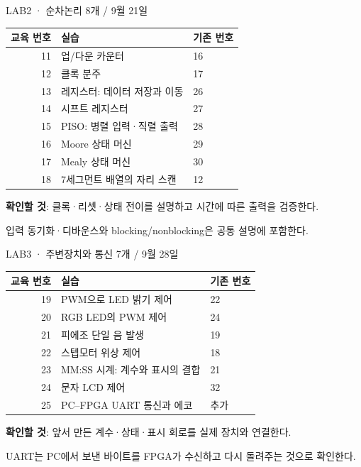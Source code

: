 \documentclass[aspectratio=169,11pt,t]{beamer}
\begin{document}
\begin{frame}{LAB2 · 순차논리 8개 / 9월 21일}
\small
\begin{tabular}{rll}
\textbf{교육 번호} & \textbf{실습} & \textbf{기존 번호}\\\hline
11 & 업/다운 카운터 & 16\\
12 & 클록 분주 & 17\\
13 & 레지스터: 데이터 저장과 이동 & 26\\
14 & 시프트 레지스터 & 27\\
15 & PISO: 병렬 입력·직렬 출력 & 28\\
16 & Moore 상태 머신 & 29\\
17 & Mealy 상태 머신 & 30\\
18 & 7세그먼트 배열의 자리 스캔 & 12
\end{tabular}
\vspace{0.25cm}\par
\textbf{확인할 것}: 클록·리셋·상태 전이를 설명하고 시간에 따른 출력을 검증한다.\par
입력 동기화·디바운스와 blocking/nonblocking은 공통 설명에 포함한다.
\end{frame}

\begin{frame}{LAB3 · 주변장치와 통신 7개 / 9월 28일}
\small
\begin{tabular}{rll}
\textbf{교육 번호} & \textbf{실습} & \textbf{기존 번호}\\\hline
19 & PWM으로 LED 밝기 제어 & 22\\
20 & RGB LED의 PWM 제어 & 24\\
21 & 피에조 단일 음 발생 & 19\\
22 & 스텝모터 위상 제어 & 18\\
23 & MM:SS 시계: 계수와 표시의 결합 & 21\\
24 & 문자 LCD 제어 & 32\\
25 & PC--FPGA UART 통신과 에코 & 추가
\end{tabular}
\vspace{0.25cm}\par
\textbf{확인할 것}: 앞서 만든 계수·상태·표시 회로를 실제 장치와 연결한다.\par
UART는 PC에서 보낸 바이트를 FPGA가 수신하고 다시 돌려주는 것으로 확인한다.
\end{frame}
\end{document}
